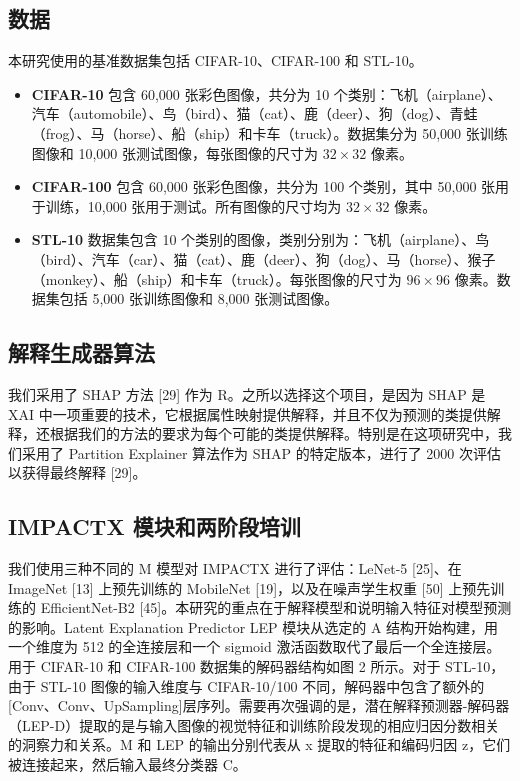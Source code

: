 \documentclass[12pt, a4paper]{ctexart} %
\begin{document}
\subsection{数据}
本研究使用的基准数据集包括 CIFAR-10、CIFAR-100 和 STL-10。

\begin{itemize}
    \item \textbf{CIFAR-10}  包含 60,000 张彩色图像，共分为 10 个类别：飞机（airplane）、汽车（automobile）、鸟（bird）、猫（cat）、鹿（deer）、狗（dog）、青蛙（frog）、马（horse）、船（ship）和卡车（truck）。数据集分为 50,000 张训练图像和 10,000 张测试图像，每张图像的尺寸为 \( 32 \times 32 \) 像素。

    \item \textbf{CIFAR-100} 包含 60,000 张彩色图像，共分为 100 个类别，其中 50,000 张用于训练，10,000 张用于测试。所有图像的尺寸均为 \( 32 \times 32 \) 像素。

    \item \textbf{STL-10} 数据集包含 10 个类别的图像，类别分别为：飞机（airplane）、鸟（bird）、汽车（car）、猫（cat）、鹿（deer）、狗（dog）、马（horse）、猴子（monkey）、船（ship）和卡车（truck）。每张图像的尺寸为 \( 96 \times 96 \) 像素。数据集包括 5,000 张训练图像和 8,000 张测试图像。
\end{itemize}
\subsection{解释生成器算法}
我们采用了 SHAP 方法 [29] 作为 R。之所以选择这个项目，是因为 SHAP 是 XAI 中一项重要的技术，它根据属性映射提供解释，并且不仅为预测的类提供解释，还根据我们的方法的要求为每个可能的类提供解释。特别是在这项研究中，我们采用了 Partition Explainer 算法作为 SHAP 的特定版本，进行了 2000 次评估以获得最终解释 [29]。
\subsection{IMPACTX 模块和两阶段培训}
我们使用三种不同的 M 模型对 IMPACTX 进行了评估：LeNet-5 [25]、在 ImageNet [13] 上预先训练的 MobileNet [19]，以及在噪声学生权重 [50] 上预先训练的 EfficientNet-B2 [45]。本研究的重点在于解释模型和说明输入特征对模型预测的影响。Latent Explanation Predictor LEP 模块从选定的 A 结构开始构建，用一个维度为 512 的全连接层和一个 sigmoid 激活函数取代了最后一个全连接层。用于 CIFAR-10 和 CIFAR-100 数据集的解码器结构如图 2 所示。对于 STL-10，由于 STL-10 图像的输入维度与 CIFAR-10/100 不同，解码器中包含了额外的[Conv、Conv、UpSampling]层序列。需要再次强调的是，潜在解释预测器-解码器（LEP-D）提取的是与输入图像的视觉特征和训练阶段发现的相应归因分数相关的洞察力和关系。M 和 LEP 的输出分别代表从 x 提取的特征和编码归因 z，它们被连接起来，然后输入最终分类器 C。
\end{document}

